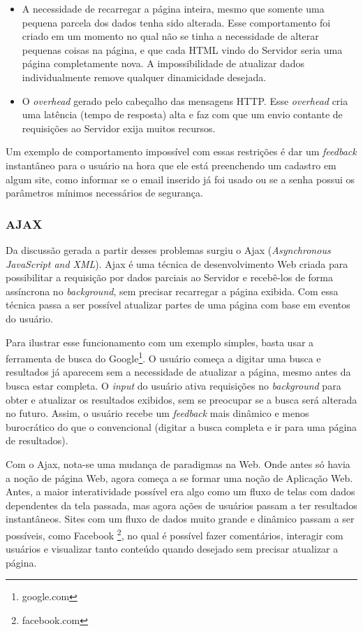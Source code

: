 \documentclass[a4paper,12pt]{article}
\begin{document}
\begin{itemize}
    \item A necessidade de recarregar a página inteira, mesmo que somente uma pequena parcela dos dados tenha sido alterada. Esse comportamento foi criado em um momento no qual não se tinha a necessidade de alterar pequenas coisas na página, e que cada HTML vindo do Servidor seria uma página completamente nova. A impossibilidade de atualizar dados individualmente remove qualquer dinamicidade desejada.

    \item O \emph{overhead} gerado pelo cabeçalho das mensagens HTTP. Esse \emph{overhead} cria uma latência (tempo de resposta) alta e faz com que um envio contante de requisições ao Servidor exija muitos recursos.
\end{itemize}

Um exemplo de comportamento impossível com essas restrições é dar um \emph{feedback} instantâneo para o usuário na hora que ele está preenchendo um cadastro em algum site, como informar se o email inserido já foi usado ou se a senha possui os parâmetros mínimos necessários de segurança.

\subsubsection{AJAX}

Da discussão gerada a partir desses problemas surgiu o Ajax (\emph{Asynchronous JavaScript and XML}). Ajax é uma técnica de desenvolvimento Web criada para possibilitar a requisição por dados parciais ao Servidor e recebê-los de forma assíncrona no \emph{background}, sem precisar recarregar a página exibida. Com essa técnica passa a ser possível atualizar partes de uma página com base em eventos do usuário.

Para ilustrar esse funcionamento com um exemplo simples, basta usar a ferramenta de busca do Google\footnote{google.com}. O usuário começa a digitar uma busca e resultados já aparecem sem a necessidade de atualizar a página, mesmo antes da busca estar completa. O \emph{input} do usuário ativa requisições no \emph{background} para obter e atualizar os resultados exibidos, sem se preocupar se a busca será alterada no futuro. Assim, o usuário recebe um \emph{feedback} mais dinâmico e menos burocrático do que o convencional (digitar a busca completa e ir para uma página de resultados).

Com o Ajax, nota-se uma mudança de paradigmas na Web. Onde antes só havia a noção de página Web, agora começa a se formar uma noção de Aplicação Web. Antes, a maior interatividade possível era algo como um fluxo de telas com dados dependentes da tela passada, mas agora ações de usuários passam a ter resultados instantâneos. Sites com um fluxo de dados muito grande e dinâmico passam a ser possíveis, como Facebook \footnote{facebook.com}, no qual é possível fazer comentários, interagir com usuários e visualizar tanto conteúdo quando desejado sem precisar atualizar a página.
\end{document}
